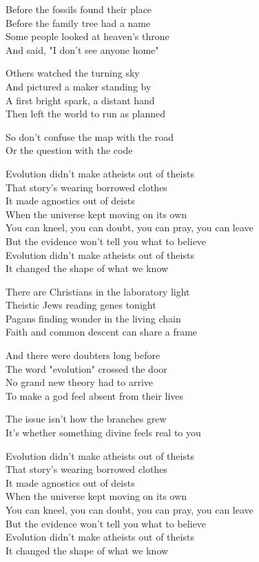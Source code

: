 \begin{lyrics}
Before the fossils found their place\\
Before the family tree had a name\\
Some people looked at heaven's throne\\
And said, "I don't see anyone home"

Others watched the turning sky\\
And pictured a maker standing by\\
A first bright spark, a distant hand\\
Then left the world to run as planned

So don't confuse the map with the road\\
Or the question with the code

Evolution didn't make atheists out of theists\\
That story's wearing borrowed clothes\\
It made agnostics out of deists\\
When the universe kept moving on its own\\
You can kneel, you can doubt, you can pray, you can leave\\
But the evidence won't tell you what to believe\\
Evolution didn't make atheists out of theists\\
It changed the shape of what we know

There are Christians in the laboratory light\\
Theistic Jews reading genes tonight\\
Pagans finding wonder in the living chain\\
Faith and common descent can share a frame

And there were doubters long before\\
The word "evolution" crossed the door\\
No grand new theory had to arrive\\
To make a god feel absent from their lives

The issue isn't how the branches grew\\
It's whether something divine feels real to you

Evolution didn't make atheists out of theists\\
That story's wearing borrowed clothes\\
It made agnostics out of deists\\
When the universe kept moving on its own\\
You can kneel, you can doubt, you can pray, you can leave\\
But the evidence won't tell you what to believe\\
Evolution didn't make atheists out of theists\\
It changed the shape of what we know


\end{lyrics}
